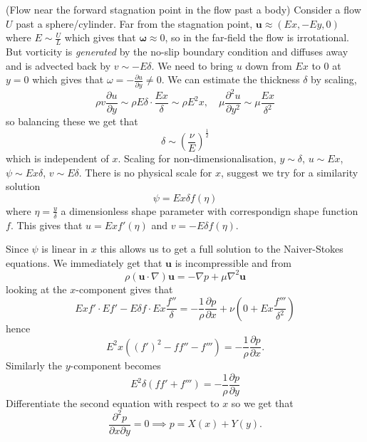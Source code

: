\documentclass{article}
\begin{document}
\begin{example}
	(Flow near the forward stagnation point in the flow past a body) Consider a flow $ U $ past a sphere/cylinder. Far from the stagnation point, $ \mathbf u \approx (Ex,-Ey,0) $ where $ E \sim \frac UL $ which gives that $ \boldsymbol\omega \approx 0 $, so in the far-field the flow is irrotational. But vorticity is \textit{generated} by the no-slip boundary condition and diffuses away and is advected back by $ v \sim -E\delta $. We need to bring $ u $ down from $ Ex $ to $ 0 $ at $ y=0 $ which gives that $ \omega = -\frac{\partial u}{\partial y} \ne 0 $. We can estimate the thickness $ \delta $ by scaling,
	\[
		\rho v \frac{\partial u}{\partial y} \sim \rho E \delta \cdot \frac{Ex}\delta \sim \rho E^2x,\quad \mu\frac{\partial^2 u}{\partial y^2} \sim \mu \frac{Ex}{\delta^2}
	\]
	so balancing these we get that 
	\[
		\delta \sim \left(\frac \nu E\right)^{\frac 12}
	\]
which is independent of $ x $. Scaling for non-dimensionalisation, $ y\sim \delta $, $ u\sim Ex $, $ \psi \sim Ex\delta $, $ v\sim E\delta $. There is no physical scale for $ x $, suggest we try for a similarity solution
\[
  \psi = Ex \delta f(\eta)
\]
where $ \eta = \frac y\delta $ a dimensionless shape parameter with correspondign shape function $ f $. This gives that $ u = Ex f' (\eta) $ and $ v = -E \delta f(\eta) $.\par
Since $ \psi $ is linear in $ x $ this allows us to get a full solution to the Naiver-Stokes equations. We immediately get that $ \mathbf u $ is incompressible and from 
\[
  \rho(\mathbf u \cdot \nabla)\mathbf u = -\nabla p + \mu \nabla^2 \mathbf u
\]
looking at the $ x $-component gives that 
\[
	Exf' \cdot Ef' - E\delta f\cdot Ex\frac{f''}\delta = -\frac 1\rho \frac{\partial p}{\partial x} + \nu \left(0 + Ex\frac{f'''}{\delta^2}\right)
\]
hence
\[
	E^2x((f')^2 - ff'' - f''') = -\frac 1\rho \frac{\partial p}{\partial x}.
\]
Similarly the $ y $-component becomes
\[
	E^2 \delta(ff'+ f''') = - \frac 1\rho \frac{\partial p}{\partial y}
\]
Differentiate the second equation with respect to $ x $ so we get that
\[
	\frac{\partial^2 p}{\partial x\partial y} = 0 \implies p = X(x) + Y(y).
\]
\end{example}
\end{document}
